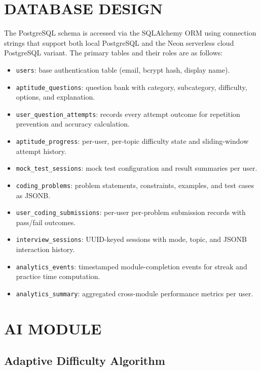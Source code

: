 \documentclass[12pt,a4paper]{report}
\begin{document}
\section{DATABASE DESIGN}

The PostgreSQL schema is accessed via the SQLAlchemy ORM using connection strings that support both local PostgreSQL and the Neon serverless cloud PostgreSQL variant. The primary tables and their roles are as follows:

\begin{itemize}[leftmargin=0.5in, topsep=4pt, itemsep=2pt]
    \item \texttt{users}: base authentication table (email, bcrypt hash, display name).
    \item \texttt{aptitude\_questions}: question bank with category, subcategory, difficulty, options, and explanation.
    \item \texttt{user\_question\_attempts}: records every attempt outcome for repetition prevention and accuracy calculation.
    \item \texttt{aptitude\_progress}: per-user, per-topic difficulty state and sliding-window attempt history.
    \item \texttt{mock\_test\_sessions}: mock test configuration and result summaries per user.
    \item \texttt{coding\_problems}: problem statements, constraints, examples, and test cases as JSONB.
    \item \texttt{user\_coding\_submissions}: per-user per-problem submission records with pass/fail outcomes.
    \item \texttt{interview\_sessions}: UUID-keyed sessions with mode, topic, and JSONB interaction history.
    \item \texttt{analytics\_events}: timestamped module-completion events for streak and practice time computation.
    \item \texttt{analytics\_summary}: aggregated cross-module performance metrics per user.
\end{itemize}

\section{AI MODULE}

\subsection{Adaptive Difficulty Algorithm}
\end{document}

